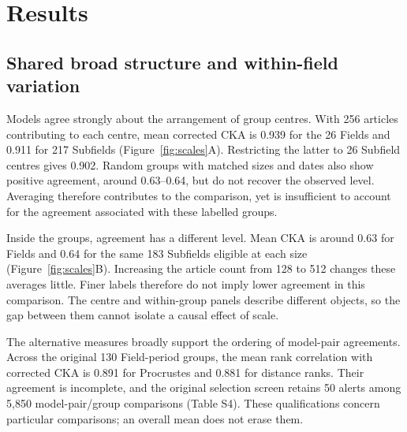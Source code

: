 \documentclass[12pt]{article}
\begin{document}
\section{Results}
\subsection{Shared broad structure and within-field variation}
Models agree strongly about the arrangement of group centres. With 256 articles contributing to each centre, mean corrected CKA is 0.939 for the 26 Fields and 0.911 for 217 Subfields (Figure~\ref{fig:scales}A). Restricting the latter to 26 Subfield centres gives 0.902. Random groups with matched sizes and dates also show positive agreement, around 0.63--0.64, but do not recover the observed level. Averaging therefore contributes to the comparison, yet is insufficient to account for the agreement associated with these labelled groups.

Inside the groups, agreement has a different level. Mean CKA is around 0.63 for Fields and 0.64 for the same 183 Subfields eligible at each size (Figure~\ref{fig:scales}B). Increasing the article count from 128 to 512 changes these averages little. Finer labels therefore do not imply lower agreement in this comparison. The centre and within-group panels describe different objects, so the gap between them cannot isolate a causal effect of scale.

The alternative measures broadly support the ordering of model-pair agreements. Across the original 130 Field-period groups, the mean rank correlation with corrected CKA is 0.891 for Procrustes and 0.881 for distance ranks. Their agreement is incomplete, and the original selection screen retains 50 alerts among 5,850 model-pair/group comparisons (Table S4). These qualifications concern particular comparisons; an overall mean does not erase them.
\end{document}
